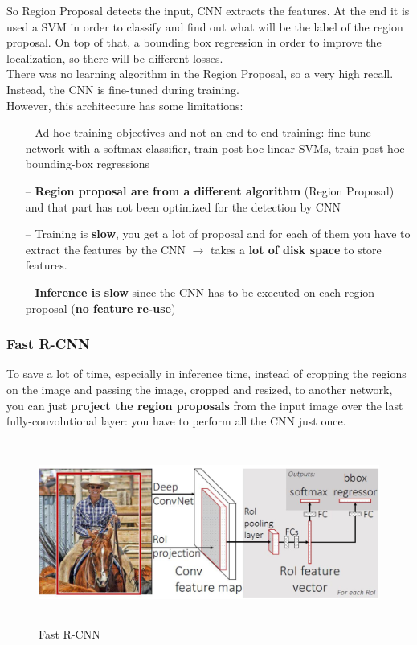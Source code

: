 So Region Proposal detects the input, CNN extracts the features. At the end it is used a SVM in order to classify and find out what will be the label of the region proposal. On top of that, a bounding box regression in order to improve the localization, so there will be different losses. \\
There was no learning algorithm in the Region Proposal, so a very high recall. Instead, the CNN is fine-tuned during training. \\
However, this architecture has some limitations: 
\begin{itemize}
    \item[--] Ad-hoc training objectives and not an end-to-end training: fine-tune network with a softmax classifier, train post-hoc linear SVMs, train post-hoc bounding-box regressions
    \item[--] \textbf{Region proposal are from a different algorithm} (Region Proposal) and that part has not been optimized for the detection by CNN
    \item[--] Training is \textbf{slow}, you get a lot of proposal and for each of them you have to extract the features by the CNN $\rightarrow$ takes a \textbf{lot of disk space} to store features. 
    \item[--] \textbf{Inference is slow} since the CNN has to be executed on each region proposal (\textbf{no feature re-use})
\end{itemize}{}

\subsubsection{Fast R-CNN}
To save a lot of time, especially in inference time, instead of cropping the regions on the image and passing the image, cropped and resized, to another network, you can just \textbf{project the region proposals} from the input image over the last fully-convolutional layer: you have to perform all the CNN just once. 

 \begin{figure}[h]
    \centering
    \includegraphics[width=15cm, height=6cm]{images/fast_r_cnn.png}
    \caption{Fast R-CNN}
    \label{fig:fast-r-cnn}
\end{figure}

